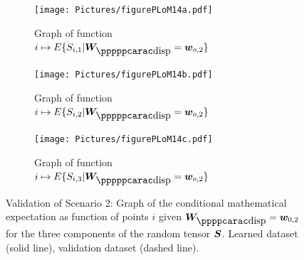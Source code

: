 \begin{figure}[!htb]
    \begin{center}
        \begin{subfigure}[b]{0.32\textwidth}
            \begin{center}
                \texttt{[image: Pictures/figurePLoM14a.pdf]}
            \end{center}
                \caption{Graph of function $i\mapsto E\{ S_{i,1} \vert \bfW_\disppp = \bfw_{o,2} \}$}
                \label{fig:figurePLoM14a}
            \end{subfigure}
            \begin{subfigure}[b]{0.32\textwidth}
                \begin{center}
                    \texttt{[image: Pictures/figurePLoM14b.pdf]}
                \end{center}
                \caption{Graph of function $i\mapsto E\{ S_{i,2} \vert \bfW_\disppp = \bfw_{o,2} \}$}
                \label{fig:figurePLoM14b}
            \end{subfigure}
            \begin{subfigure}[b]{0.32\textwidth}
                \begin{center}
                    \texttt{[image: Pictures/figurePLoM14c.pdf]}
                \end{center}
                \caption{Graph of function $i\mapsto E\{ S_{i,3} \vert \bfW_\disppp = \bfw_{o,2} \}$}
                \label{fig:figurePLoM14c}
            \end{subfigure}
    \end{center}
    \caption[Validation of Scenario 2: Graph of the conditional mathematical expectation.]{Validation of Scenario 2: Graph of the conditional mathematical expectation as function of points $i$ given $\bfW_\dispp =\bfw_{0,2}$ for the three components of the random tensor ${\boldsymbol{S}}$.  Learned dataset (solid line), validation dataset (dashed line).}
    \label{fig:figurePLoM14}
\end{figure}